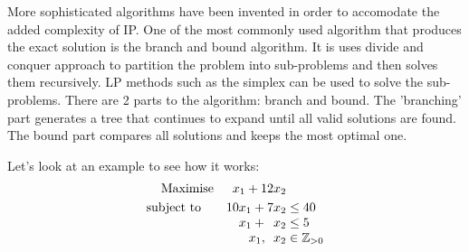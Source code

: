 More sophisticated algorithms have been invented in order to accomodate the added complexity of IP. One of the most commonly
used algorithm that produces the exact solution is the branch and bound algorithm. It is uses divide and
conquer approach to partition the problem into sub-problems
and then solves them recursively. LP methods such as the simplex can be used to solve the sub-problems.
There are 2 parts to the algorithm: branch and bound. The 'branching' part generates a tree
that continues to expand until all valid solutions are found. The bound part compares all solutions and keeps the
most optimal one.

Let's look at an example to see how it works:
\[
  \begin{array}{r@{}r@{}l}
    \text{Maximise} \quad &{}x_{1} + 12x_{2} \\[\jot]
    \text{subject to}\qquad &{}10x_{1} +   7x_{2} &{} \leq 40 \\
    \qquad &{} x_{1} +   \phantom{2}x_{2} &{} \leq 5 \\
    \qquad &{} x_{1} ,   \phantom{2}x_{2} &{} \in \mathbb{Z}_{>0}\\
  \end{array}
\]

